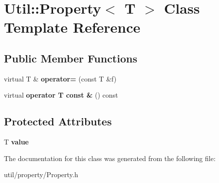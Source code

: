 \hypertarget{class_util_1_1_property}{}\section{Util\+:\+:Property$<$ T $>$ Class Template Reference}
\label{class_util_1_1_property}
\subsection*{Public Member Functions}
\begin{DoxyCompactItemize}
\item 
\mbox{\label{class_util_1_1_property_afea5192ef3d7fe210bc64364b2fc8e1b}} 
virtual T \& {\bfseries operator=} (const T \&f)
\item 
\mbox{\label{class_util_1_1_property_aba922067ce641f9a200062d812f1bb46}} 
virtual {\bfseries operator T const \&} () const
\end{DoxyCompactItemize}
\subsection*{Protected Attributes}
\begin{DoxyCompactItemize}
\item 
\mbox{\label{class_util_1_1_property_aa85134f89b68d852a3b8b741dbe981bd}} 
T {\bfseries value}
\end{DoxyCompactItemize}


The documentation for this class was generated from the following file\+:\begin{DoxyCompactItemize}
\item 
util/property/Property.\+h\end{DoxyCompactItemize}
